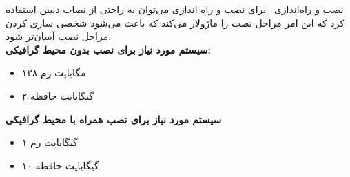 
\subtitle{قسمت دوم: نصب}
\author{مهدی صفریان \alongside محمدیاسین داوده}

\start

\begin{frame}{نصب و راه‌اندازی~\cite{deb_book}}
  برای نصب و راه اندازی می‌توان به راحتی از نصاب دبیین استفاده کرد که این امر مراحل نصب را ماژولار می‌کند که باعث می‌شود شخصی سازی کردن مراحل نصب آسان‌تر شود.\\
  \textbf{سیستم مورد نیاز برای نصب بدون محیط گرافیکی:}
  \begin{itemize}
    \item ۱۲۸ مگابایت رم
    \item ۲ گیگابایت حافظه
  \end{itemize}
  \textbf{سیستم مورد نیاز برای نصب همراه با محیط گرافیکی}
  \begin{itemize}
    \item ۱ گیگابایت رم
    \item ۱۰ گیگابایت حافظه
  \end{itemize}
\end{frame}
